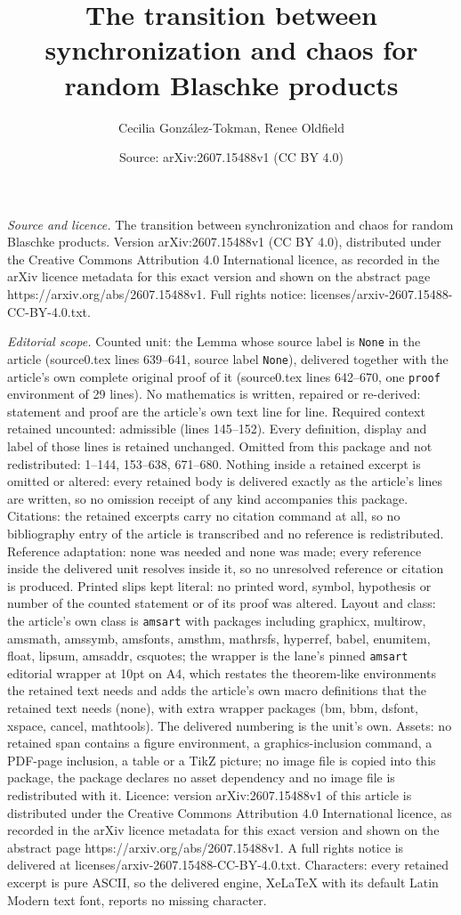 \documentclass[10pt,a4paper]{amsart}
\title[The transition between synchronization and chaos for random ]{The transition between synchronization and chaos for random Blaschke products}
\author{Cecilia Gonz\'alez-Tokman, Renee Oldfield}
\date{Source: arXiv:2607.15488v1 (CC BY 4.0)}
\begin{document}
\maketitle

\noindent\emph{Source and licence.} The transition between synchronization and chaos for random Blaschke products. Version arXiv:2607.15488v1 (CC BY 4.0), distributed under the Creative Commons Attribution 4.0 International licence, as recorded in the arXiv licence metadata for this exact version and shown on the abstract page https://arxiv.org/abs/2607.15488v1. Full rights notice: licenses/arxiv-2607.15488-CC-BY-4.0.txt.\par\smallskip

\noindent\textit{Editorial scope.} Counted unit: the Lemma whose source label is \texttt{None} in the article (source0.tex lines 639--641, source label \texttt{None}), delivered together with the article's own complete original proof of it (source0.tex lines 642--670, one \texttt{proof} environment of 29 lines). No mathematics is written, repaired or re-derived: statement and proof are the article's own text line for line. Required context retained uncounted: admissible (lines 145--152). Every definition, display and label of those lines is retained unchanged. Omitted from this package and not redistributed: 1--144, 153--638, 671--680. Nothing inside a retained excerpt is omitted or altered: every retained body is delivered exactly as the article's lines are written, so no omission receipt of any kind accompanies this package. Citations: the retained excerpts carry no citation command at all, so no bibliography entry of the article is transcribed and no reference is redistributed. Reference adaptation: none was needed and none was made; every reference inside the delivered unit resolves inside it, so no unresolved reference or citation is produced. Printed slips kept literal: no printed word, symbol, hypothesis or number of the counted statement or of its proof was altered. Layout and class: the article's own class is \texttt{amsart} with packages including graphicx, multirow, amsmath, amssymb, amsfonts, amsthm, mathrsfs, hyperref, babel, enumitem, float, lipsum, amsaddr, csquotes; the wrapper is the lane's pinned \texttt{amsart} editorial wrapper at 10pt on A4, which restates the theorem-like environments the retained text needs and adds the article's own macro definitions that the retained text needs (none), with extra wrapper packages (bm, bbm, dsfont, xspace, cancel, mathtools). The delivered numbering is the unit's own. Assets: no retained span contains a figure environment, a graphics-inclusion command, a PDF-page inclusion, a table or a TikZ picture; no image file is copied into this package, the package declares no asset dependency and no image file is redistributed with it. Licence: version arXiv:2607.15488v1 of this article is distributed under the Creative Commons Attribution 4.0 International licence, as recorded in the arXiv licence metadata for this exact version and shown on the abstract page https://arxiv.org/abs/2607.15488v1. A full rights notice is delivered at licenses/arxiv-2607.15488-CC-BY-4.0.txt. Characters: every retained excerpt is pure ASCII, so the delivered engine, XeLaTeX with its default Latin Modern text font, reports no missing character.
\end{document}
